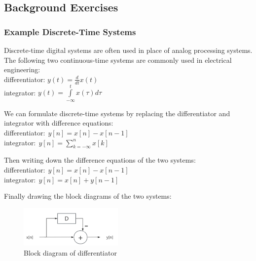 \documentclass[journal]{IEEEtran}
\begin{document}
\subsection{Background Exercises}
\subsubsection{Example Discrete-Time Systems}
Discrete-time digital systems are often used in place of analog processing systems. 
The following two continuous-time systems are commonly used in electrical engineering:
\vspace{\baselineskip}
\\differentiator: $ y(t) = \frac{d}{dt}x(t) $
\vspace{\baselineskip}
\\integrator: $ y(t) = \int\limits_{-\infty}^t x(\tau) d\tau $
\vspace{\baselineskip}

We can formulate discrete-time systems by replacing the differentiator and integrator with difference equations:
\vspace{\baselineskip}
\\differentiator:$~~y[n] = x[n] - x[n-1]$
\vspace{\baselineskip}
\\integrator:$~~y[n] = \sum_{k=-\infty}^{n} x[k]$

\vspace{\baselineskip}
Then writing down the difference equations of the two systems:
\vspace{\baselineskip}
\\differentiator:$~~y[n] = x[n] - x[n-1]$
\vspace{\baselineskip}
\\integrator:$~~y[n] = x[n] + y[n-1]$
\vspace{\baselineskip}

Finally drawing the block diagrams of the two systems:


\begin{figure}[H]
   \centering
   \includegraphics[width=0.45\textwidth]{differ.png} %
   \caption{Block diagram of differentiator }
   \label{fig:differ}
 \end{figure}
\end{document}
